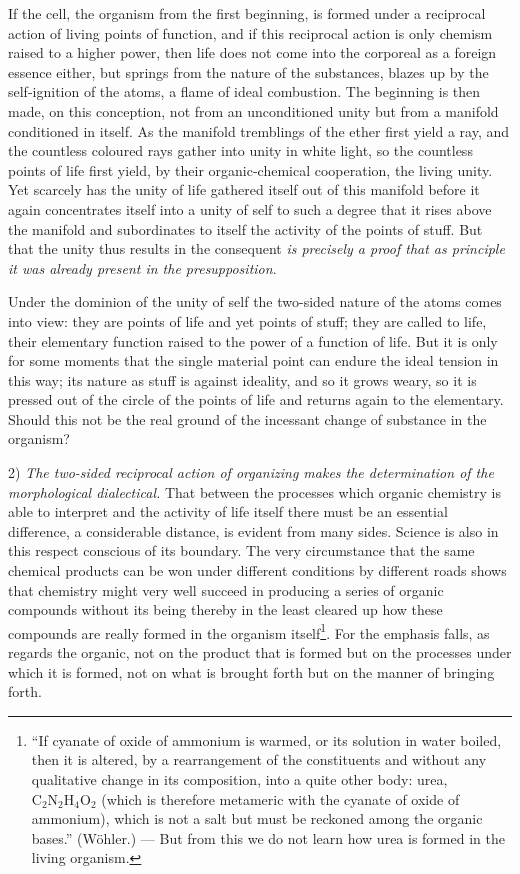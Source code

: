 \documentclass[12pt,a4paper]{book}
\begin{document}
If the cell, the organism from the first beginning, is formed under a
reciprocal action of living points of function, and if this reciprocal action
is only chemism raised to a higher power, then life does not come into the
corporeal as a foreign essence either, but springs from the nature of the
substances, blazes up by the self-ignition of the atoms, a flame of ideal
combustion. The beginning is then made, on this conception, not from an
unconditioned unity but from a manifold conditioned in itself. As the manifold
tremblings of the ether first yield a ray, and the countless coloured rays
gather into unity in white light, so the countless points of life first yield,
by their organic-chemical cooperation, the living unity. Yet scarcely has the
unity of life gathered itself out of this manifold before it again concentrates
itself into a unity of self to such a degree that it rises above the manifold
and subordinates to itself the activity of the points of stuff. But that the
unity thus results in the consequent \emph{is precisely a proof that as
principle it was already present in the presupposition}.

Under the dominion of the unity of self the two-sided nature of the atoms comes
into view: they are points of life and yet points of stuff; they are called to
life, their elementary function raised to the power of a function of life. But
it is only for some moments that the single material point can endure the ideal
tension in this way; its nature as stuff is against ideality, and so it grows
weary, so it is pressed out of the circle of the points of life and returns
again to the elementary. Should this not be the real ground of the incessant
change of substance in the organism?

2) \emph{The two-sided reciprocal action of organizing makes the determination
of the morphological dialectical.} That between the processes which organic
chemistry
\setcounter{footnote}{0}
is able to interpret and the activity of life itself there must be an essential
difference, a considerable distance, is evident from many sides. Science is
also in this respect conscious of its boundary. The very circumstance that the
same chemical products can be won under different conditions by different roads
shows that chemistry might very well succeed in producing a series of organic
compounds without its being thereby in the least cleared up how these compounds
are really formed in the organism itself\footnote{``If cyanate of oxide of
ammonium is warmed, or its solution in water boiled, then it is altered, by a
rearrangement of the constituents and without any qualitative change in its
composition, into a quite other body: urea,
$\mathrm{C}_2\mathrm{N}_2\mathrm{H}_4\mathrm{O}_2$ (which is therefore
metameric with the cyanate of oxide of ammonium), which is not a salt but must
be reckoned among the organic bases.'' (Wöhler.) --- But from this we do not
learn how urea is formed in the living organism.}.
For the emphasis falls, as regards the organic, not on the product that is
formed but on the processes under which it is formed, not on what is brought
forth but on the manner of bringing forth.
\end{document}

